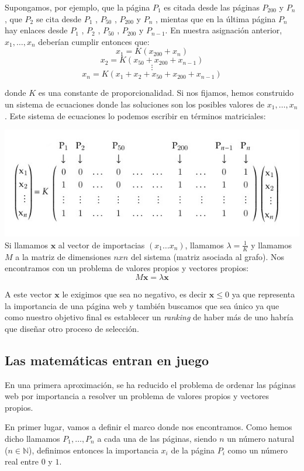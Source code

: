\documentclass[size=a4, parskip=half, titlepage=false, toc=flat, toc=bib, 12pt]{scrartcl}
\theoremstyle{theorem-style}
\theoremstyle{definition-style}
\theoremstyle{remark-style}
\theoremstyle{example-style}
\theoremstyle{definition-style}
\theoremstyle{remark-style}
\begin{document}
Supongamos, por ejemplo, que la página $P_1$ es citada desde las páginas $P_{200}$ y $P_{n}$ ,
 que $P_2$ se cita desde $P_1$ , $P_{50}$ , $P_{200}$ y $P_n$ , mientas que en la última página $P_n$ hay enlaces desde $P_1$ , $P_2$ , $P_{50}$ , $P_{200}$ y $P_{n-1}$. En nuestra asignación anterior, $x_1, \dots , x_n$ deberían
 cumplir entonces que:
 $$ x_1 = K (x_{200} + x_n) $$
 $$ x_2 = K (x_{50} + x_{200} + x_{n-1}) $$
 $$ \vdots $$
 $$x_n = K (x_1 + x_2 + x_{50} + x_{200} + x_{n-1}) $$

donde $K$ es una constante de proporcionalidad. Si nos fijamos, hemos construido un sistema de ecuaciones
donde las soluciones son los posibles valores de $x_1, \dots , x_n$. Este sistema de ecuaciones
lo podemos escribir en términos matriciales:

\includegraphics[width=1.0\textwidth]{./img/matrizejemplo}
Si llamamos $\boldsymbol{x}$ al vector de importacias $(x_1 \dots x_n)$, llamamos $\lambda = \frac{1}{K}$ y llamamos
$M$ a la matriz de dimensiones $n x n$ del sistema (matriz asociada al grafo). Nos encontramos
con un problema de valores propios y vectores propios:
$$M \boldsymbol{x} = \lambda \boldsymbol{x} $$

A este vector $\boldsymbol{x}$ le exigimos que sea no negativo, es decir $\boldsymbol{x} \leq 0$ ya que representa la importancia
de una página web y también buscamos que sea único ya que como nuestro objetivo final es establecer un
\textit{ranking} de haber más de uno habría que diseñar otro proceso de selección.

\subsection{Las matemáticas entran en juego}

En una primera aproximación, se ha reducido el problema de ordenar las páginas web por importancia a resolver un problema de valores propios y vectores propios.

En primer lugar, vamos a definir el marco donde nos encontramos. Como hemos dicho llamamos $P_1, \dots, P_n$ a cada una de las páginas, siendo $n$ un número natural ($n \in \mathbb{N}$), definimos entonces la importancia $x_i$  de la página $P_i$ como un número real entre $0$ y $1$.
\end{document}
